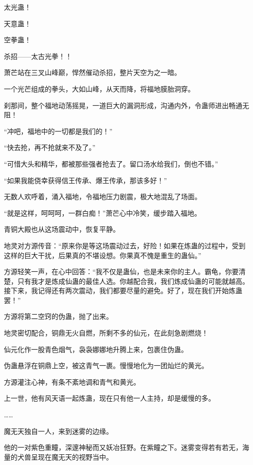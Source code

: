 
\begin{this_body}

太光蛊！

天意蛊！

空拳蛊！

杀招——太古光拳！！

萧芒站在三叉山峰巅，悍然催动杀招，整片天空为之一暗。

一个光芒组成的拳头，大如山峰，从天而降，将福地膜胎洞穿。

刹那间，整个福地动荡摇晃，一道巨大的漏洞形成，沟通内外，令蛊师进出畅通无阻！

“冲吧，福地中的一切都是我们的！”

“快去抢，再不抢就来不及了。”

“可惜大头和精华，都被那些强者抢去了。留口汤水给我们，倒也不错。”

“如果我能侥幸获得信王传承、爆王传承，那该多好！”

无数人欢呼着，涌入福地，令福地压力剧震，极大地混乱了场面。

“就是这样，呵呵呵，一群白痴！”萧芒心中冷笑，缓步踏入福地。

青铜大殿也从这场震动中，恢复平静。

地灵对方源传音：“原来你是等这场震动过去，好险！如果在炼蛊的过程中，受到这样的巨大干扰，后果真的不堪设想。你果真不愧是重生的蛊仙。”

方源轻笑一声，在心中回答：“我不仅是蛊仙，也是未来你的主人。霸龟，你要清楚，只有我才是炼成仙蛊的最佳人选。你越配合我，我们炼成仙蛊的可能就越高。接下来，我记得还有两次震动，我们都要尽量的避免。好了，现在我们开始炼蛊罢！”

方源将第二空窍的伪蛊，抛了出来。

地灵密切配合，铜鼎无火自燃，所剩不多的仙元，在此刻急剧燃烧！

仙元化作一股青色烟气，袅袅娜娜地升腾上来，包裹住伪蛊。

伪蛊悬浮在铜鼎上空，被这青气一裹。慢慢地化为一团灿烂的黄光。

方源灌注心神，有条不紊地调和青气和黄光。

上一世，他有风天语一起炼蛊，现在只有他一人主持，却是缓慢的多。

……

魔无天独自一人，来到迷雾的边缘。

他的一对紫色重瞳，深邃神秘而又妖冶狂野。在紫瞳之下。迷雾变得若有若无，海量的犬兽呈现在魔无天的视野当中。


\end{this_body}
